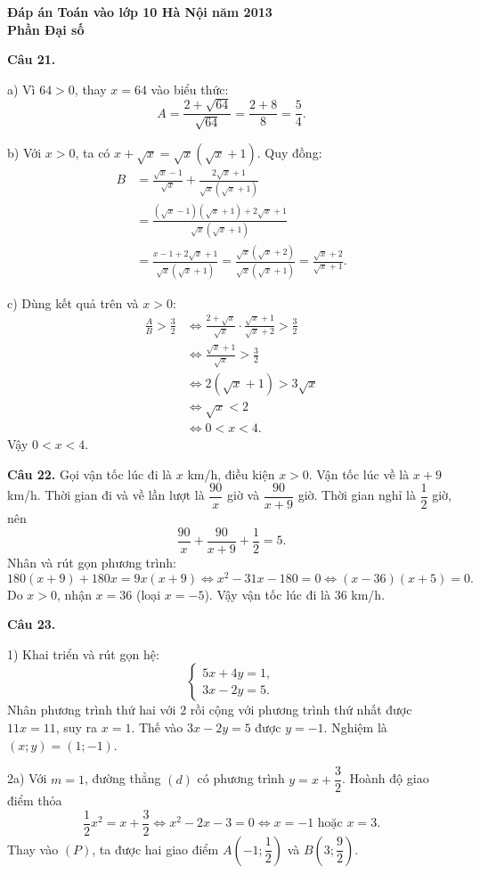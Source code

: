 \documentclass[12pt,a4paper]{article}
\begin{document}
\begin{center}\Large\bfseries Đáp án Toán vào lớp 10 Hà Nội năm 2013\\Phần Đại số\end{center}

\textbf{Câu 21.}

a) Vì $64>0$, thay $x=64$ vào biểu thức:
\[
A=\frac{2+\sqrt{64}}{\sqrt{64}}=\frac{2+8}{8}=\frac54.
\]

b) Với $x>0$, ta có $x+\sqrt{x}=\sqrt{x}(\sqrt{x}+1)$. Quy đồng:
\begin{align*}
B&=\frac{\sqrt{x}-1}{\sqrt{x}}+\frac{2\sqrt{x}+1}{\sqrt{x}(\sqrt{x}+1)}\\
&=\frac{(\sqrt{x}-1)(\sqrt{x}+1)+2\sqrt{x}+1}{\sqrt{x}(\sqrt{x}+1)}\\
&=\frac{x-1+2\sqrt{x}+1}{\sqrt{x}(\sqrt{x}+1)}
=\frac{\sqrt{x}(\sqrt{x}+2)}{\sqrt{x}(\sqrt{x}+1)}
=\frac{\sqrt{x}+2}{\sqrt{x}+1}.
\end{align*}

c) Dùng kết quả trên và $x>0$:
\begin{align*}
\frac AB>\frac32
&\iff \frac{2+\sqrt{x}}{\sqrt{x}}\cdot\frac{\sqrt{x}+1}{\sqrt{x}+2}>\frac32\\
&\iff \frac{\sqrt{x}+1}{\sqrt{x}}>\frac32\\
&\iff 2(\sqrt{x}+1)>3\sqrt{x}\\
&\iff \sqrt{x}<2\\
&\iff 0<x<4.
\end{align*}
Vậy $0<x<4$.

\textbf{Câu 22.} Gọi vận tốc lúc đi là $x$ km/h, điều kiện $x>0$. Vận tốc lúc về là $x+9$ km/h. Thời gian đi và về lần lượt là $\dfrac{90}{x}$ giờ và $\dfrac{90}{x+9}$ giờ. Thời gian nghỉ là $\dfrac12$ giờ, nên
\[
\frac{90}{x}+\frac{90}{x+9}+\frac12=5.
\]
Nhân và rút gọn phương trình:
\[
180(x+9)+180x=9x(x+9)
\iff x^2-31x-180=0
\iff (x-36)(x+5)=0.
\]
Do $x>0$, nhận $x=36$ (loại $x=-5$). Vậy vận tốc lúc đi là $36$ km/h.

\textbf{Câu 23.}

1) Khai triển và rút gọn hệ:
\[
\begin{cases}
5x+4y=1,\\
3x-2y=5.
\end{cases}
\]
Nhân phương trình thứ hai với $2$ rồi cộng với phương trình thứ nhất được $11x=11$, suy ra $x=1$. Thế vào $3x-2y=5$ được $y=-1$. Nghiệm là $(x;y)=(1;-1)$.

2a) Với $m=1$, đường thẳng $(d)$ có phương trình $y=x+\dfrac32$. Hoành độ giao điểm thỏa
\[
\frac12x^2=x+\frac32\iff x^2-2x-3=0\iff x=-1\text{ hoặc }x=3.
\]
Thay vào $(P)$, ta được hai giao điểm $A\left(-1;\dfrac12\right)$ và $B\left(3;\dfrac92\right)$.
\end{document}
